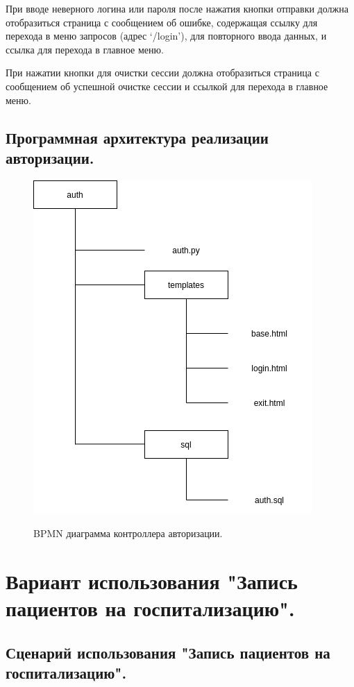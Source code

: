 \documentclass[12pt, a4paper]{article}
\begin{document}
    При вводе неверного логина или пароля после нажатия кнопки отправки должна
    отобразиться страница с сообщением об ошибке, содержащая ссылку для перехода в меню
    запросов (адрес ‘/login’), для повторного ввода данных, и ссылка для перехода в главное
    меню.
    
    При нажатии кнопки для очистки сессии должна отобразиться страница с сообщением об
    успешной очистке сессии и ссылкой для перехода в главное меню.
    
    \newpage
    \subsection{Программная архитектура реализации авторизации.}
    \begin{figure}[ht!]
    	\centering    %
    	\includegraphics[height=0.4\textheight]{pictures/auth_arch.png}
    	\label{fig:pic8} %
    	\caption{BPMN диаграмма контроллера авторизации.}
    \end{figure}

    \section{Вариант использования "Запись пациентов на госпитализацию".}
    \subsection{Сценарий использования "Запись пациентов на госпитализацию".}
    
\end{document}
